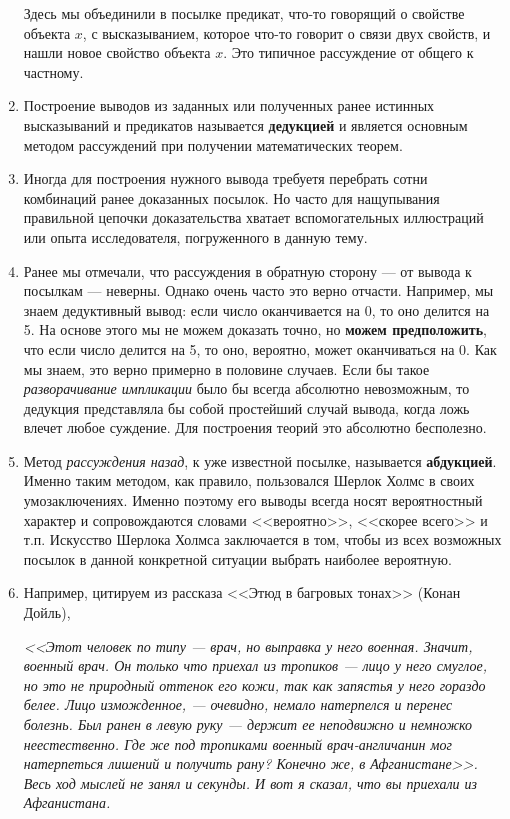 \begin{enumerate}
Здесь мы объединили в посылке предикат, что-то говорящий о свойстве объекта $x$, с высказыванием, которое что-то говорит о связи двух свойств, и нашли новое свойство объекта $x$. Это типичное рассуждение от общего к частному.
\item Построение выводов из заданных или полученных ранее истинных высказываний и предикатов называется \textbf{дедукцией} и является основным методом рассуждений при получении математических теорем.
\item Иногда для построения нужного вывода требуетя перебрать сотни комбинаций ранее доказанных посылок. Но часто для нащупывания правильной цепочки доказательства хватает вспомогательных иллюстраций или опыта исследователя, погруженного в данную тему.
\item Ранее мы отмечали, что рассуждения в обратную сторону --- от вывода к посылкам --- неверны. Однако очень часто это верно отчасти. Например, мы знаем дедуктивный вывод: если число оканчивается на 0, то оно делится на 5. На основе этого мы не можем доказать точно, но \textbf{можем предположить}, что если число делится на 5, то оно, вероятно, может оканчиваться на 0. Как мы знаем, это верно примерно в половине случаев. Если бы такое \textit{разворачивание импликации} было бы всегда абсолютно невозможным, то дедукция представляла бы собой простейший случай вывода, когда ложь влечет любое суждение. Для построения теорий это абсолютно бесполезно.
\item Метод \textit{рассуждения назад}, к уже известной посылке, называется \textbf{абдукцией}. Именно таким методом, как правило, пользовался Шерлок Холмс в своих умозаключениях. Именно поэтому его выводы всегда носят вероятностный характер и сопровождаются словами <<вероятно>>, <<скорее всего>> и т.п. Искусство Шерлока Холмса заключается в том, чтобы из всех возможных посылок в данной конкретной ситуации выбрать наиболее вероятную.
\item Например, цитируем из рассказа <<Этюд в багровых тонах>> (Конан Дойль),

\textit{<<Этот человек по типу --- врач, но выправка у него военная. Значит, военный врач. Он только что приехал из тропиков --- лицо у него смуглое, но это не природный оттенок его кожи, так как запястья у него гораздо белее. Лицо изможденное, --- очевидно, немало натерпелся и перенес болезнь. Был ранен в левую руку --- держит ее неподвижно и немножко неестественно. Где же под тропиками военный врач-англичанин мог натерпеться лишений и получить рану? Конечно же, в Афганистане>>. Весь ход мыслей не занял и секунды. И вот я сказал, что вы приехали из Афганистана.}


\end{enumerate}

